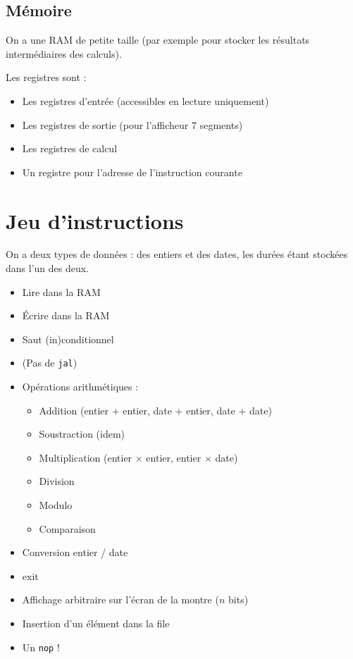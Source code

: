 \documentclass[a4paper]{article}
\begin{document}
\subsection{Mémoire}

On a une RAM de petite taille (par exemple pour stocker les résultats
intermédiaires des calculs).

Les registres sont :
\begin{itemize}
\item Les registres d'entrée (accessibles en lecture uniquement)
\item Les registres de sortie (pour l'afficheur 7 segments)
\item Les registres de calcul
\item Un registre pour l'adresse de l'instruction courante
\end{itemize}

\section{Jeu d'instructions}

On a deux types de données : des entiers et des dates, les durées étant
stockées dans l'un des deux.

\begin{itemize}
\item Lire dans la RAM
\item Écrire dans la RAM
\item Saut (in)conditionnel
\item (Pas de \texttt{jal})
\item Opérations arithmétiques :
\begin{itemize}
\item Addition (entier $+$ entier, date $+$ entier, date $+$ date)
\item Soustraction (idem)
\item Multiplication (entier $\times$  entier, entier $\times$ date)
\item Division
\item Modulo
\item Comparaison
\end{itemize}
\item Conversion entier / date
\item exit
\item Affichage arbitraire sur l'écran de la montre ($n$ bits)
\item Insertion d'un élément dans la file
\item Un \texttt{nop} !
\end{itemize}
\end{document}
